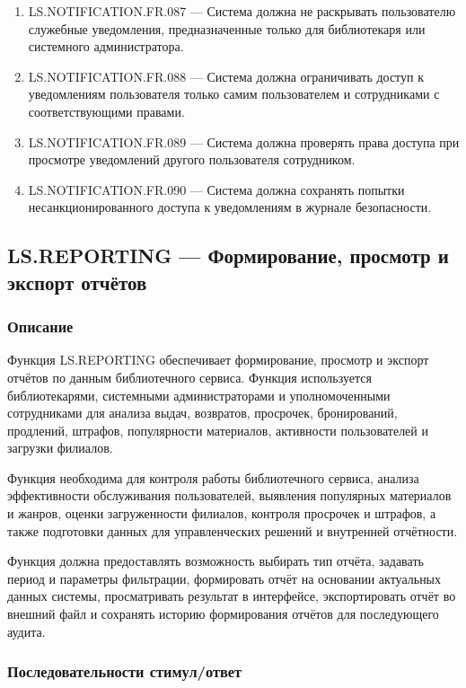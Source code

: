 \documentclass[12pt,a4paper]{article}
\begin{document}
\begin{enumerate}
		\item LS.NOTIFICATION.FR.087 --- Система должна не раскрывать пользователю служебные
		уведомления, предназначенные только для библиотекаря или системного администратора.
		
		\item LS.NOTIFICATION.FR.088 --- Система должна ограничивать доступ к уведомлениям
		пользователя только самим пользователем и сотрудниками с соответствующими правами.
		
		\item LS.NOTIFICATION.FR.089 --- Система должна проверять права доступа при просмотре
		уведомлений другого пользователя сотрудником.
		
		\item LS.NOTIFICATION.FR.090 --- Система должна сохранять попытки несанкционированного
		доступа к уведомлениям в журнале безопасности.
	\end{enumerate}
	
	\subsection{LS.REPORTING --- Формирование, просмотр и экспорт отчётов}
	
	\subsubsection{Описание}
	
	Функция LS.REPORTING обеспечивает формирование, просмотр и экспорт отчётов
	по данным библиотечного сервиса. Функция используется библиотекарями,
	системными администраторами и уполномоченными сотрудниками для анализа
	выдач, возвратов, просрочек, бронирований, продлений, штрафов, популярности
	материалов, активности пользователей и загрузки филиалов.
	
	Функция необходима для контроля работы библиотечного сервиса, анализа
	эффективности обслуживания пользователей, выявления популярных материалов
	и жанров, оценки загруженности филиалов, контроля просрочек и штрафов,
	а также подготовки данных для управленческих решений и внутренней отчётности.
	
	Функция должна предоставлять возможность выбирать тип отчёта, задавать период
	и параметры фильтрации, формировать отчёт на основании актуальных данных
	системы, просматривать результат в интерфейсе, экспортировать отчёт во внешний
	файл и сохранять историю формирования отчётов для последующего аудита.
	
	\subsubsection{Последовательности стимул/ответ}
	
\end{document}
